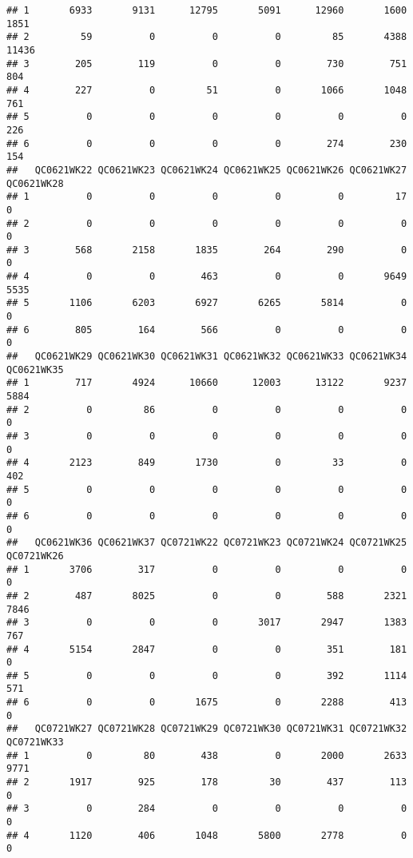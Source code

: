 \documentclass[
]{article}
\begin{document}
\begin{verbatim}
## 1       6933       9131      12795       5091      12960       1600       1851
## 2         59          0          0          0         85       4388      11436
## 3        205        119          0          0        730        751        804
## 4        227          0         51          0       1066       1048        761
## 5          0          0          0          0          0          0        226
## 6          0          0          0          0        274        230        154
##   QC0621WK22 QC0621WK23 QC0621WK24 QC0621WK25 QC0621WK26 QC0621WK27 QC0621WK28
## 1          0          0          0          0          0         17          0
## 2          0          0          0          0          0          0          0
## 3        568       2158       1835        264        290          0          0
## 4          0          0        463          0          0       9649       5535
## 5       1106       6203       6927       6265       5814          0          0
## 6        805        164        566          0          0          0          0
##   QC0621WK29 QC0621WK30 QC0621WK31 QC0621WK32 QC0621WK33 QC0621WK34 QC0621WK35
## 1        717       4924      10660      12003      13122       9237       5884
## 2          0         86          0          0          0          0          0
## 3          0          0          0          0          0          0          0
## 4       2123        849       1730          0         33          0        402
## 5          0          0          0          0          0          0          0
## 6          0          0          0          0          0          0          0
##   QC0621WK36 QC0621WK37 QC0721WK22 QC0721WK23 QC0721WK24 QC0721WK25 QC0721WK26
## 1       3706        317          0          0          0          0          0
## 2        487       8025          0          0        588       2321       7846
## 3          0          0          0       3017       2947       1383        767
## 4       5154       2847          0          0        351        181          0
## 5          0          0          0          0        392       1114        571
## 6          0          0       1675          0       2288        413          0
##   QC0721WK27 QC0721WK28 QC0721WK29 QC0721WK30 QC0721WK31 QC0721WK32 QC0721WK33
## 1          0         80        438          0       2000       2633       9771
## 2       1917        925        178         30        437        113          0
## 3          0        284          0          0          0          0          0
## 4       1120        406       1048       5800       2778          0          0

\end{verbatim}
\end{document}
